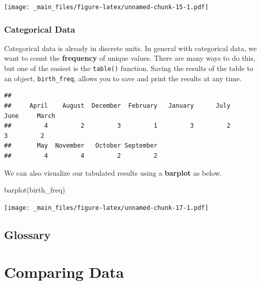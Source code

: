 \documentclass[
]{book}
\newenvironment{Shaded}{\begin{snugshade}}{\end{snugshade}}
\newcommand{\FunctionTok}[1]{\textcolor[rgb]{0.00,0.00,0.00}{#1}}
\newcommand{\NormalTok}[1]{#1}
\newcommand{\OtherTok}[1]{\textcolor[rgb]{0.56,0.35,0.01}{#1}}
\newcommand{\SpecialCharTok}[1]{\textcolor[rgb]{0.00,0.00,0.00}{#1}}
\begin{document}
\texttt{[image: \_main\_files/figure-latex/unnamed-chunk-15-1.pdf]}

\hypertarget{categorical-data}{%
\subsection{Categorical Data}\label{categorical-data}}

Categorical data is already in discrete units. In general with categorical data, we want to count the \textbf{frequency} of unique values. There are many ways to do this, but one of the easiest is the \texttt{table()} function. Saving the results of the table to an object, \texttt{birth\_freq}, allows you to save and print the results at any time.

\begin{Shaded}
\end{Shaded}

\begin{verbatim}
## 
##     April    August  December  February   January      July      June     March 
##         4         2         3         1         3         2         3         2 
##       May  November   October September 
##         4         4         2         2
\end{verbatim}

We can also visualize our tabulated results using a \textbf{barplot} as below.

\begin{Shaded}
\begin{Highlighting}[]
\FunctionTok{barplot}\NormalTok{(birth\_freq)}
\end{Highlighting}
\end{Shaded}

\texttt{[image: \_main\_files/figure-latex/unnamed-chunk-17-1.pdf]}

\hypertarget{glossary-1}{%
\section*{Glossary}\label{glossary-1}}

\hypertarget{comparing-data}{%
\chapter{Comparing Data}\label{comparing-data}}
\end{document}
